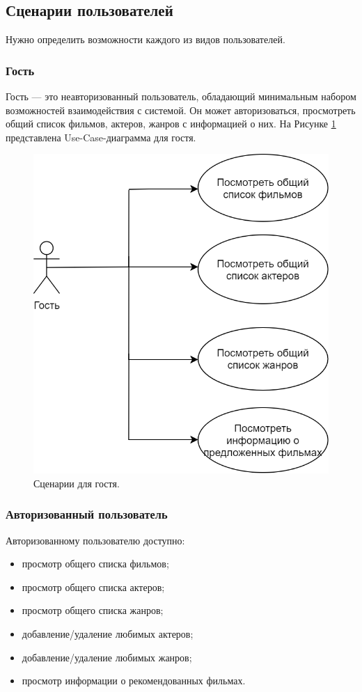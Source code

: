 \subsection{Сценарии пользователей}
Нужно определить возможности каждого из видов пользователей. 
\subsubsection{Гость}
Гость — это неавторизованный пользователь, обладающий минимальным набором возможностей взаимодействия с системой. Он может авторизоваться, просмотреть общий список фильмов, актеров, жанров с информацией о них. На Рисунке \ref{img:UseCaseGuest} представлена Use-Case-диаграмма для гостя.

\begin{figure}[h!]
	\centering
	\includegraphics[scale=0.3]{img/UseCaseGuest.png}
	\caption{Сценарии для гостя.}
	\label{img:UseCaseGuest}
\end{figure}
\newpage

\subsubsection{Авторизованный пользователь}
Авторизованному пользователю доступно:
\begin{itemize}
	\item[1)] просмотр общего списка фильмов;
	\item[2)] просмотр общего списка актеров;
	\item[3)] просмотр общего списка жанров;
	\item[4)] добавление/удаление любимых актеров;
	\item[5)] добавление/удаление любимых жанров;
	\item[6)] просмотр информации о рекомендованных фильмах.    
\end{itemize}

